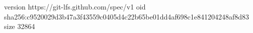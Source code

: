 version https://git-lfs.github.com/spec/v1
oid sha256:c9520029d3b47a3f43559c0405d4c22b65be01dd4af698c1e841204248af8d83
size 32864
